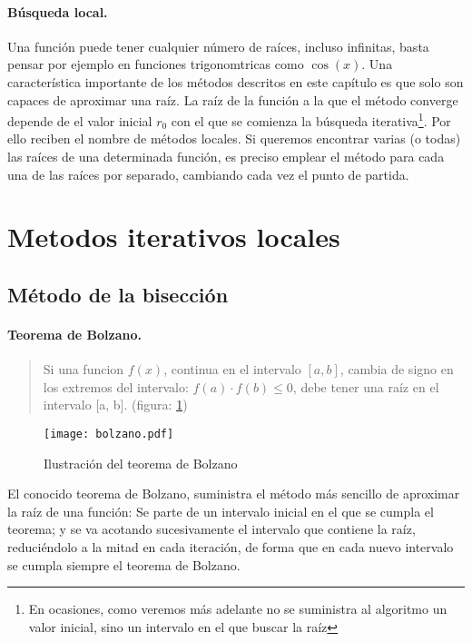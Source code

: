 \paragraph*{Búsqueda local.} Una función puede tener cualquier número de raíces, incluso infinitas, basta pensar por ejemplo en funciones trigonomtricas como $\cos(x)$. Una característica importante de los métodos descritos en este capítulo es que solo son capaces de aproximar una raíz. La raíz de la función a la que el método converge depende de el valor inicial $r_0$ con el que se comienza la búsqueda iterativa\footnote{En ocasiones, como veremos más adelante no se suministra al algoritmo un valor inicial, sino un intervalo en el que buscar la raíz}. Por ello reciben el nombre de métodos locales. Si queremos encontrar varias (o todas) las raíces de una determinada función, es preciso emplear el método para cada una de las raíces por separado, cambiando cada vez el punto de partida.

\section{Metodos iterativos locales}
\subsection{Método de la bisección}
\paragraph*{Teorema de Bolzano.}
\begin{quote}
Si una funcion $f(x)$, continua en el intervalo $[a, b]$, cambia de signo en los extremos del intervalo: $f(a)\cdot f(b) \le 0$, debe tener una raíz en el intervalo [a, b]. (figura: \ref{fig:bolzano}) 
\end{quote}

\begin{figure}[h]
\centering
\texttt{[image: bolzano.pdf]}
\caption{Ilustración del teorema de Bolzano}
\label{fig:bolzano}
\end{figure}

El conocido teorema de Bolzano, suministra el método más sencillo de aproximar la raíz de una función: Se parte de un intervalo inicial en el que se cumpla el teorema; y se va acotando sucesivamente el intervalo que contiene la raíz, reduciéndolo a la mitad en cada iteración, de forma que en cada nuevo intervalo se cumpla siempre el teorema de Bolzano.

